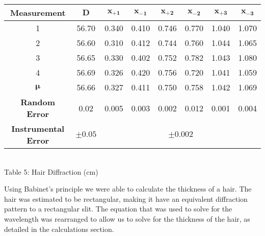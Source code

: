 \begin{center}
    \begin{tabular}{|c|c|c c c c c c|}
        \hline
        \textbf{Measurement} & $\bm{D}$ & $\bm{x_{+1}}$ & $\bm{x_{-1}}$ & $\bm{x_{+2}}$ & $\bm{x_{-2}}$ & $\bm{x_{+3}}$ & $\bm{x_{-3}}$\\ \hline
        1                     & 56.70  & 0.340 & 0.410  & 0.746 & 0.770 & 1.040 & 1.070 \\ 
        2                     & 56.60  & 0.310 & 0.412  & 0.744 & 0.760 & 1.044 & 1.065\\ 
        3                     & 56.65  & 0.330 & 0.402  & 0.752 & 0.782 & 1.043 & 1.080\\ 
        4                     & 56.69  & 0.326 & 0.420  & 0.756 & 0.720 & 1.041 & 1.059\\ \hline \hline
        $\bm{\mu}$            & 56.66  & 0.327 & 0.411  & 0.750 & 0.758 & 1.042 & 1.069\\ 
        \textbf{Random Error} & 0.02   & 0.005 & 0.003  & 0.002 & 0.012 & 0.001 & 0.004\\ 
        \textbf{Instrumental Error} & $\pm 0.05$ & \multicolumn{6}{c|}{$\pm 0.002$} \\ \hline
    \end{tabular}
    \vspace{3mm}
    \\Table 5: Hair Diffraction (cm)\\

\end{center}
Using Babinet's principle we were able to calculate the thickness of a hair. 
The hair was estimated to be rectangular, making it have an equivalent diffraction pattern to a rectangular slit. 
The equation that was used to solve for the wavelength was rearranged to allow us to solve for the thickness of the hair, as detailed in the calculations section.
